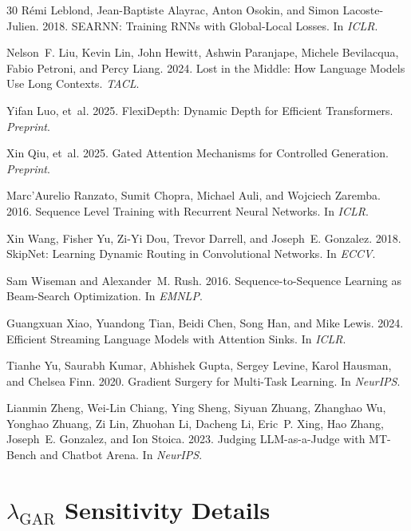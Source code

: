 \documentclass[11pt,a4paper]{article}
\begin{document}
\begin{thebibliography}{30}
R{\'e}mi Leblond, Jean-Baptiste Alayrac, Anton Osokin, and Simon Lacoste-Julien. 2018. SEARNN: Training RNNs with Global-Local Losses. In \emph{ICLR}.

Nelson~F. Liu, Kevin Lin, John Hewitt, Ashwin Paranjape, Michele Bevilacqua, Fabio Petroni, and Percy Liang. 2024. Lost in the Middle: How Language Models Use Long Contexts. \emph{TACL}.

Yifan Luo, et~al. 2025. FlexiDepth: Dynamic Depth for Efficient Transformers. \emph{Preprint}.

Xin Qiu, et~al. 2025. Gated Attention Mechanisms for Controlled Generation. \emph{Preprint}.

Marc'Aurelio Ranzato, Sumit Chopra, Michael Auli, and Wojciech Zaremba. 2016. Sequence Level Training with Recurrent Neural Networks. In \emph{ICLR}.

Xin Wang, Fisher Yu, Zi-Yi Dou, Trevor Darrell, and Joseph~E. Gonzalez. 2018. SkipNet: Learning Dynamic Routing in Convolutional Networks. In \emph{ECCV}.

Sam Wiseman and Alexander~M. Rush. 2016. Sequence-to-Sequence Learning as Beam-Search Optimization. In \emph{EMNLP}.

Guangxuan Xiao, Yuandong Tian, Beidi Chen, Song Han, and Mike Lewis. 2024. Efficient Streaming Language Models with Attention Sinks. In \emph{ICLR}.

Tianhe Yu, Saurabh Kumar, Abhishek Gupta, Sergey Levine, Karol Hausman, and Chelsea Finn. 2020. Gradient Surgery for Multi-Task Learning. In \emph{NeurIPS}.

Lianmin Zheng, Wei-Lin Chiang, Ying Sheng, Siyuan Zhuang, Zhanghao Wu, Yonghao Zhuang, Zi Lin, Zhuohan Li, Dacheng Li, Eric~P. Xing, Hao Zhang, Joseph~E. Gonzalez, and Ion Stoica. 2023. Judging LLM-as-a-Judge with MT-Bench and Chatbot Arena. In \emph{NeurIPS}.

\end{thebibliography}

\appendix
\section{$\lambda_{\text{GAR}}$ Sensitivity Details}
\end{document}
